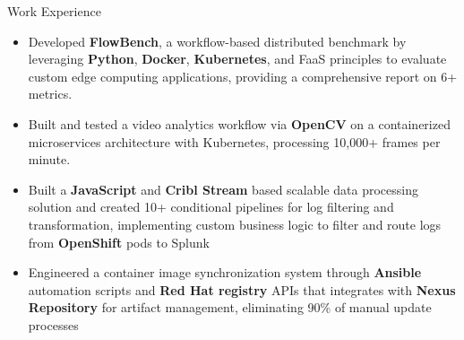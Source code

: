 \documentclass{resume}
\begin{document}

    \begin{experienceSection}{Work Experience}
    \experienceItem[
        company={Arizona State University},
        location={Remote},
        position={Research Assistant, VISA Lab},
        duration={Jun 2025 - Present}
    ]
    \begin{itemize}
        \itemsep -6pt {}
        \item Developed \textbf{FlowBench}, a workflow-based distributed benchmark by leveraging \textbf{Python}, \textbf{Docker}, \textbf{Kubernetes}, and FaaS principles to evaluate custom edge computing applications, providing a comprehensive report on 6+ metrics.
        \item Built and tested a video analytics workflow via \textbf{OpenCV} on a containerized microservices architecture with Kubernetes, processing 10,000+ frames per minute.
    \end{itemize}


    \experienceItem[
        company={Arch Mortgage Insurance},
        location={Greensboro, NC},
        position={Software Engineer Intern},
        duration={Jun 2024 - Aug 2024}
    ]
    \begin{itemize}
        \itemsep -6pt {}
        \item Built a \textbf{JavaScript} and \textbf{Cribl Stream} based scalable data processing solution and created 10+ conditional pipelines for log filtering and transformation, implementing custom business logic to filter and route logs from \textbf{OpenShift} pods to Splunk
        \item Engineered a container image synchronization system through \textbf{Ansible} automation scripts and \textbf{Red Hat registry} APIs that integrates with \textbf{Nexus Repository} for artifact management, eliminating 90\% of manual update processes
        
    \end{itemize}


\end{experienceSection}
\end{document}
